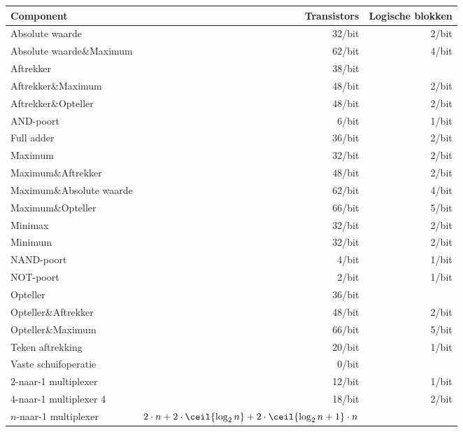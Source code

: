 \begin{tabular}{l|rr}
Component&Transistors&Logische blokken\\\hline
Absolute waarde&32/bit&2/bit\\
Absolute waarde\&Maximum&62/bit&4/bit\\
Aftrekker&38/bit&\\
Aftrekker\&Maximum&48/bit&2/bit\\
Aftrekker\&Opteller&48/bit&2/bit\\
AND-poort&6/bit&1/bit\\
Full adder&36/bit&2/bit\\
Maximum&32/bit&2/bit\\
Maximum\&Aftrekker&48/bit&2/bit\\
Maximum\&Absolute waarde&62/bit&4/bit\\
Maximum\&Opteller&66/bit&5/bit\\
Minimax&32/bit&2/bit\\
Minimum&32/bit&2/bit\\
NAND-poort&4/bit&1/bit\\
NOT-poort&2/bit&1/bit\\
Opteller&36/bit&\\
Opteller\&Aftrekker&48/bit&2/bit\\
Opteller\&Maximum&66/bit&5/bit\\
Teken aftrekking&20/bit&1/bit\\
Vaste schuifoperatie&0/bit&\\
2-naar-1 multiplexer&12/bit&1/bit\\
4-naar-1 multiplexer 4&18/bit&2/bit\\
$n$-naar-1 multiplexer&$2\cdot n+2\cdot\ceil{\log_2 n}+2\cdot\ceil{\log_2 n+1}\cdot n$&
\end{tabular}